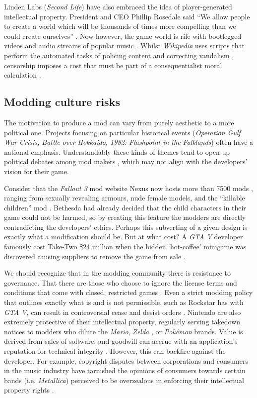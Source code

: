 \documentclass{scrartcl}
\begin{document}
Linden Labs (\textit{Second Life}) have also embraced the idea of player-generated intellectual property. President and CEO Phillip Rosedale said ``We allow people to create a world which will be thousands of times more compelling than we could create ourselves'' \cite{herman2006your}. Now however, the game world is rife with bootlegged videos and audio streams of popular music \cite{herman2006your}. Whilst \textit{Wikipedia} uses scripts that perform the automated tasks of policing content and correcting vandalism \cite{hong2014becoming}, censorship imposes a cost that must be part of a consequentialist moral calculation \cite{schulzke2010defending}.

\subsection*{Modding culture risks}

The motivation to produce a mod can vary from purely aesthetic to a more political one. Projects focusing on particular historical events (\textit{Operation Gulf War Crisis, Battle over Hokkaido, 1982: Flashpoint in the Falklands}) often have a national emphasis. Understandably these kinds of themes tend to open up political debates among mod makers \cite{sotamaa2010game}, which may not align with the developers' vision for their game.

Consider that the \textit{Fallout 3} mod website Nexus now hosts more than 7500 mods \cite{bostan2010explorations}, ranging from sexually revealing armours, nude female models, and the ``killable children'' mod \cite{bostan2010explorations}. Bethesda had already decided that the child characters in their game could not be harmed, so by creating this feature the modders are directly contradicting the developers' ethics. Perhaps this subverting of a given design is exactly what a modification should be. But at what cost? A \textit{GTA V} developer famously cost Take-Two {\$}24 million when the hidden `hot-coffee' minigame was discovered causing suppliers to remove the game from sale \cite{hotcoffee1}.

We should recognize that in the modding community there is resistance to governance. That there are those who choose to ignore the license terms and conditions that come with closed, restricted games \cite{scacchi2010computer}. Even a strict modding policy that outlines exactly what is and is not permissible, such as Rockstar has with \textit{GTA V}, can result in controversial cease and desist orders \cite{gta1}. Nintendo are also extremely protective of their intellectual property, regularly serving takedown notices to modders who dilute the \textit{Mario}, \textit{Zelda} \cite{nintendo1}, or \textit{Pok{\'e}mon} \cite{pokemon1} brands. Value is derived from sales of software, and goodwill can accrue with an application's reputation for technical integrity \cite{herman2006your}. However, this can backfire against the developer. For example, copyright disputes between corporations and consumers in the music industry have tarnished the opinions of consumers towards certain bands (i.e. \textit{Metallica}) perceived to be overzealous in enforcing their intellectual property rights \cite{herman2006your}. 
\end{document}

